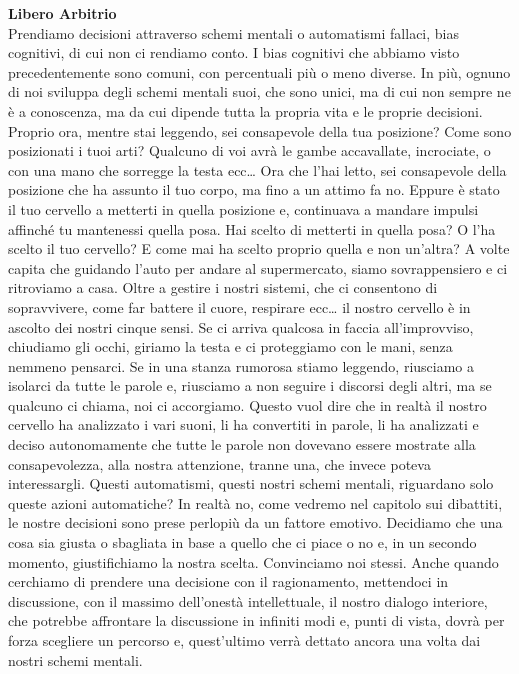 \documentclass[12pt]{book} %
\begin{document}
\noindent \textbf{\large Libero Arbitrio} \\
Prendiamo decisioni attraverso schemi mentali o automatismi fallaci, bias cognitivi, di cui non ci rendiamo conto. I
bias cognitivi che abbiamo visto precedentemente sono comuni, con percentuali più o meno diverse. In più,
ognuno di noi sviluppa degli schemi mentali suoi, che sono unici, ma di cui non sempre ne è a conoscenza, ma da cui
dipende tutta la propria vita e le proprie decisioni. Proprio ora, mentre stai leggendo, sei consapevole della tua
posizione? Come sono posizionati i tuoi arti? Qualcuno di voi avrà le gambe accavallate, incrociate, o con una mano che
sorregge la testa ecc… Ora che l'hai letto, sei consapevole della posizione che ha assunto il tuo
corpo, ma fino a un attimo fa no. Eppure è stato il tuo cervello a metterti in quella posizione e, continuava a mandare
impulsi affinché tu mantenessi quella posa. Hai scelto di metterti in quella posa? O l'ha scelto
il tuo cervello? E come mai ha scelto proprio quella e non un'altra? A volte capita che guidando
l'auto per andare al supermercato, siamo sovrappensiero e ci ritroviamo a casa. Oltre a gestire i nostri sistemi, che ci consentono di sopravvivere, come far battere il cuore, respirare ecc… il nostro cervello
è in ascolto dei nostri cinque sensi. Se ci arriva qualcosa in faccia all'improvviso,
chiudiamo gli occhi, giriamo la testa e ci proteggiamo con le mani, senza nemmeno pensarci. Se in una stanza rumorosa
stiamo leggendo, riusciamo a isolarci da tutte le parole e, riusciamo a non seguire i discorsi degli altri, ma se
qualcuno ci chiama, noi ci accorgiamo. Questo vuol dire che in realtà il nostro cervello ha analizzato i vari suoni,
li ha convertiti in parole, li ha analizzati e deciso autonomamente che tutte le parole non dovevano essere mostrate
alla consapevolezza, alla nostra attenzione, tranne una, che invece poteva interessargli. Questi automatismi, questi
nostri schemi mentali, riguardano solo queste azioni automatiche? In realtà no, come vedremo nel capitolo sui
dibattiti, le nostre decisioni sono prese perlopiù da un fattore emotivo. Decidiamo che una cosa sia giusta o sbagliata
in base a quello che ci piace o no e, in un secondo momento, giustifichiamo la nostra scelta. Convinciamo noi stessi.
Anche quando cerchiamo di prendere una decisione con il ragionamento, mettendoci in discussione, con il massimo
dell'onestà intellettuale, il nostro dialogo interiore, che potrebbe affrontare la discussione in
infiniti modi e, punti di vista, dovrà per forza scegliere un percorso e, quest'ultimo verrà
dettato ancora una volta dai nostri schemi mentali. 
\end{document}
